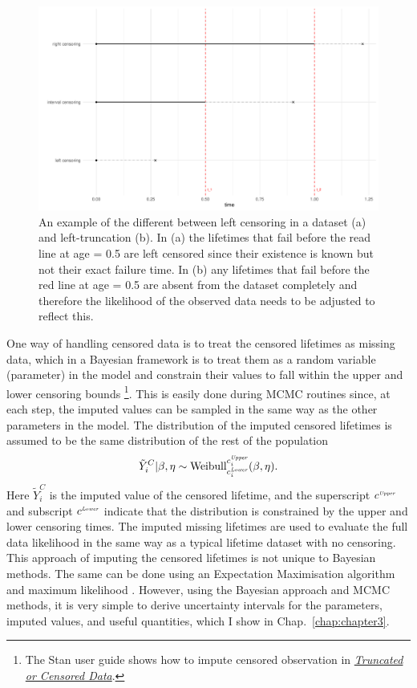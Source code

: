 \begin{figure}[h]
    \centering
    \includegraphics[width=1\textwidth]{./figures/ch-2/censoring_example.pdf}
    \caption{An example of the different between left censoring in a dataset (a) and left-truncation (b). In (a) the lifetimes that fail before the read line at age = 0.5 are left censored since their existence is known but not their exact failure time. In (b) any lifetimes that fail before the red line at age = 0.5 are absent from the dataset completely and therefore the likelihood of the observed data needs to be adjusted to reflect this.}
    \label{fig:cense_examp}
\end{figure}

One way of handling censored data is to treat the censored lifetimes as missing data, which in a Bayesian framework is to treat them as a random variable (parameter) in the model \citep[p.211]{reich2019} and constrain their values to fall within the upper and lower censoring bounds \citep{stan_user_guide2024}\footnote{The Stan user guide shows how to impute censored observation in \href{https://mc-stan.org/docs/stan-users-guide/truncation-censoring.html}{\textit{Truncated or Censored Data}}.}. This is easily done during MCMC routines since, at each step, the imputed values can be sampled in the same way as the other parameters in the model. The distribution of the imputed censored lifetimes is assumed to be the same distribution of the rest of the population
\begin{equation}
    \label{eq:impute-cens}
    \tilde{Y}^C_i|\beta, \eta \sim \hbox{Weibull}^{c^{\textit{\tiny{Upper}}}_i}_{c^{\textit{\tiny{Lower}}}_i}(\beta, \eta).
\end{equation}
Here $\tilde{Y}^C_i$ is the imputed value of the censored lifetime, and the superscript $c^{\textit{\tiny{Upper}}}$ and subscript $c^{\textit{\tiny{Lower}}}$ indicate that the distribution is constrained by the upper and lower censoring times. The imputed missing lifetimes are used to evaluate the full data likelihood in the same way as a typical lifetime dataset with no censoring. This approach of imputing the censored lifetimes is not unique to Bayesian methods. The same can be done using an Expectation Maximisation algorithm and maximum likelihood \citep{mitra2013}. However, using the Bayesian approach and MCMC methods, it is very simple to derive uncertainty intervals for the parameters, imputed values, and useful quantities, which I show in Chap.~\ref{chap:chapter3}.

